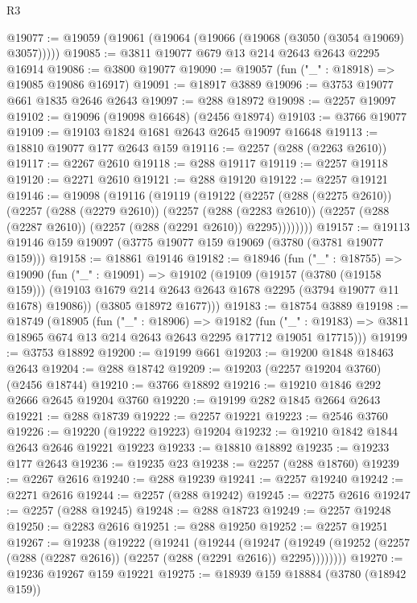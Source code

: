 \begin{lexlean}{R3}
\begin{coremodule}
@19077 := @19059 (@19061 (@19064 (@19066 (@19068 (@3050 (@3054 @19069) @3057)))))
@19085 := @3811 @19077 @679 @13 @214 @2643 @2643 @2295 @16914
@19086 := @3800 @19077
@19090 := @19057 (fun ("_" : @18918) => @19085 @19086 @16917)
@19091 := @18917 @3889
@19096 := @3753 @19077 @661 @1835 @2646 @2643
@19097 := @288 @18972
@19098 := @2257 @19097
@19102 := @19096 (@19098 @16648) (@2456 @18974)
@19103 := @3766 @19077
@19109 := @19103 @1824 @1681 @2643 @2645 @19097 @16648
@19113 := @18810 @19077 @177 @2643 @159
@19116 := @2257 (@288 (@2263 @2610))
@19117 := @2267 @2610
@19118 := @288 @19117
@19119 := @2257 @19118
@19120 := @2271 @2610
@19121 := @288 @19120
@19122 := @2257 @19121
@19146 := @19098
    (@19116
      (@19119
        (@19122
          (@2257
            (@288 (@2275 @2610))
            (@2257
              (@288 (@2279 @2610))
              (@2257
                (@288 (@2283 @2610))
                (@2257 (@288 (@2287 @2610)) (@2257 (@288 (@2291 @2610)) @2295))))))))
@19157 := @19113 @19146 @159 @19097 (@3775 @19077 @159 @19069 (@3780 (@3781 @19077 @159)))
@19158 := @18861 @19146
@19182 := @18946
    (fun ("_" : @18755) =>
    @19090
      (fun ("_" : @19091) =>
      @19102
        (@19109
          (@19157 (@3780 (@19158 @159)))
          (@19103 @1679 @214 @2643 @2643 @1678 @2295 (@3794 @19077 @11 @1678) @19086))
        (@3805 @18972 @1677)))
@19183 := @18754 @3889
@19198 := @18749
    (@18905
      (fun ("_" : @18906) =>
      @19182
        (fun ("_" : @19183) => @3811 @18965 @674 @13 @214 @2643 @2643 @2295 @17712 @19051 @17715)))
@19199 := @3753 @18892
@19200 := @19199 @661
@19203 := @19200 @1848 @18463 @2643
@19204 := @288 @18742
@19209 := @19203 (@2257 @19204 @3760) (@2456 @18744)
@19210 := @3766 @18892
@19216 := @19210 @1846 @292 @2666 @2645 @19204 @3760
@19220 := @19199 @282 @1845 @2664 @2643
@19221 := @288 @18739
@19222 := @2257 @19221
@19223 := @2546 @3760
@19226 := @19220 (@19222 @19223) @19204
@19232 := @19210 @1842 @1844 @2643 @2646 @19221 @19223
@19233 := @18810 @18892
@19235 := @19233 @177 @2643
@19236 := @19235 @23
@19238 := @2257 (@288 @18760)
@19239 := @2267 @2616
@19240 := @288 @19239
@19241 := @2257 @19240
@19242 := @2271 @2616
@19244 := @2257 (@288 @19242)
@19245 := @2275 @2616
@19247 := @2257 (@288 @19245)
@19248 := @288 @18723
@19249 := @2257 @19248
@19250 := @2283 @2616
@19251 := @288 @19250
@19252 := @2257 @19251
@19267 := @19238
    (@19222
      (@19241
        (@19244
          (@19247
            (@19249 (@19252 (@2257 (@288 (@2287 @2616)) (@2257 (@288 (@2291 @2616)) @2295))))))))
@19270 := @19236 @19267 @159 @19221
@19275 := @18939 @159 @18884 (@3780 (@18942 @159))

\end{coremodule}
\end{lexlean}

